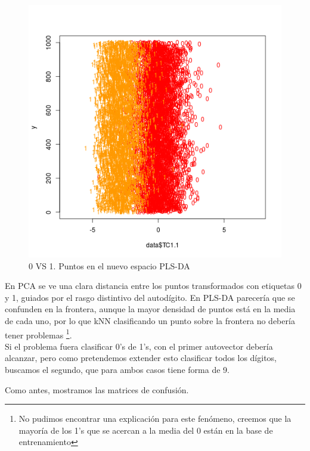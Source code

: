 \begin{figure}[h!]
  \begin{center}
	\includegraphics[scale=0.8]{exp5/PLS-1-0vs1}
	\caption{0 VS 1. Puntos en el nuevo espacio PLS-DA}
  \end{center}
\end{figure}

En PCA se ve una clara distancia entre los puntos transformados con etiquetas 0 y 1, guiados por el rasgo distintivo del autod\'igito. En PLS-DA parecer\'ia que se confunden en la frontera, aunque la mayor densidad de puntos est\'a en la media de cada uno, por lo que kNN clasificando un punto sobre la frontera no deber\'ia tener problemas \footnote{No pudimos encontrar una explicaci\'on para este fen\'omeno, creemos que la mayor\'ia de los 1's que se acercan a la media del 0 est\'an en la base de entrenamiento}.\\

Si el problema fuera clasificar 0's de 1's, con el primer autovector deber\'ia alcanzar, pero como pretendemos extender esto clasificar todos los d\'igitos, buscamos el segundo, que para ambos casos tiene forma de 9.

Como antes, mostramos las matrices de confusi\'on.

\newpage

